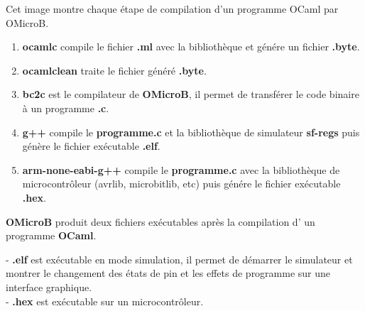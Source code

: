 \documentclass[14px]{article}
\begin{document}
\begin{figure}
\end{figure}

Cet image montre chaque étape de compilation d'un programme OCaml par OMicroB.
\begin{enumerate}
	\item \textbf{ocamlc} compile le fichier \textbf{.ml} avec la bibliothèque et génére un fichier \textbf{.byte}.
	\item \textbf{ocamlclean} traite le fichier généré \textbf{.byte}.
	\item \textbf{bc2c} est le compilateur de \textbf{OMicroB}, il permet de transférer le code binaire à un programme \textbf{.c}.
	\item \textbf{g++} compile le \textbf{programme.c} et la bibliothèque de simulateur \textbf{sf-regs} puis génère le fichier exécutable \textbf{.elf}.
	\item \textbf{arm-none-eabi-g++} compile le \textbf{programme.c} avec la bibliothèque de microcontrôleur (avrlib, microbitlib, etc) puis génére le fichier exécutable \textbf{.hex}.\\
\end{enumerate}

\textbf{OMicroB} produit deux fichiers exécutables après la compilation d'  un programme \textbf{OCaml}.

- \textbf{.elf} est exécutable en mode simulation, il permet de démarrer le simulateur et montrer le changement des états de pin et les effets de programme sur une interface graphique.\\
- \textbf{.hex} est exécutable sur un microcontrôleur.
\end{document}
